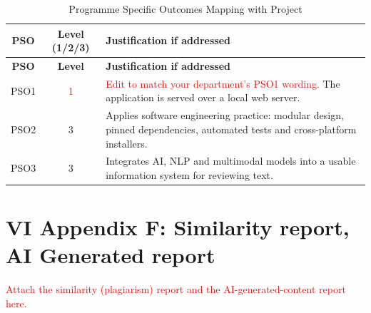 \documentclass[12pt,a4paper,oneside]{report}
\newcommand{\FILL}[1]{\textcolor{red}{#1}}
\begin{document}
\begin{longtable}{|c|c|L{11cm}|}
\caption{Programme Specific Outcomes Mapping with Project}\\
\hline
\textbf{PSO} & \textbf{Level (1/2/3)} & \textbf{Justification if addressed}\\ \hline\endfirsthead
\hline \textbf{PSO} & \textbf{Level} & \textbf{Justification if addressed}\\ \hline\endhead
PSO1 & \FILL{1} & \FILL{Edit to match your department's PSO1 wording.} The application is served over a local web
server.\\ \hline
PSO2 & 3 & Applies software engineering practice: modular design, pinned dependencies, automated tests and
cross-platform installers.\\ \hline
PSO3 & 3 & Integrates AI, NLP and multimodal models into a usable information system for reviewing text.\\ \hline
\end{longtable}

\clearpage
\section*{VI \quad Appendix F: Similarity report, AI Generated report}
\FILL{Attach the similarity (plagiarism) report and the AI-generated-content report here.}
\end{document}

